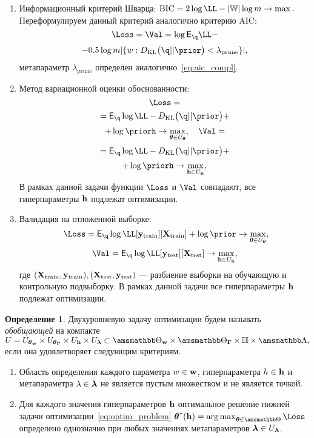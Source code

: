 \documentclass[11pt, a5paper]{dissert}
\theoremstyle{definition}
\newtheorem{defin}{Определение}
\DeclareMathOperator*{\argmax}{arg\,max}
\begin{document}
{\begin{enumerate}
\item Информационный критерий Шварца:
$
    \text{BIC} = 2\log \LL - |\Wb| \log m   \to \max.
$
Переформулируем данный критерий аналогично критерию AIC:
\begin{equation}
\label{eq:optim_bic}
    \Loss = \Val = \log \E_{\q}\LL - 
\end{equation}
\[
 - 0.5 \log m |\{w: \KL{\q}{\prior}<\lambda_{\text{prune}}\}|,
\]
метапараметр $\lambda_{\text{prune}}$ определен аналогично~\eqref{eq:aic_compl}.

\item Метод вариационной оценки обоснованности:
\begin{equation}
\label{eq:optim_elbo_method}   
    \Loss = 
\end{equation}
\[
= \E_{\q} \log \LL - \KL{\q}{\prior} + 
\]
\[
+\log\priorh \to \max_{\teta \in \Uteta}, \quad    \Val = 
\]
\[
= \E_{\q} \log \LL - \KL{\q}{\prior} +
\]
\[+ \log\priorh \to \max_{\h \in \Uh},
\]
В рамках данной задачи функции $\Loss$ и $\Val$ совпадают, все гиперпараметры $\mathbf{h}$ подлежат оптимизации.

\item Валидация на отложенной выборке:
\begin{equation}
\label{eq:optim_hold_out}
    \Loss = \E_{\q} \log \LL[\y_\text{train}][\X_\text{train}] + \log \prior \to \max_{\teta \in \Uteta},
\end{equation}
\[
    \Val = \E_{\q} \log \LL[\y_\text{test}][\X_\text{test}] \to \max_{\h \in \Uh},
\]
где $(\mathbf{X}_\text{train}, \mathbf{y}_\text{train}), (\mathbf{X}_\text{test}, \mathbf{y}_\text{test})$ --- разбиение выборки на обучающую и контрольную подвыборку.
В рамках данной задачи все гиперпараметры $\mathbf{h}$ подлежат оптимизации.

\end{enumerate}

\begin{defin}
Двухуровневую задачу оптимизации будем называть \textit{обобщающей} на компакте $U = \Utetaw \times \UtetaG \times \Uh \times \Ulam \subset \Tetawb \times \TetaGb \times \Hb \times \Lamb,$ если она удовлетворяет следующим критериям.
\begin{enumerate}
\item Область определения каждого параметра $w \in \mathbf{w}$, гиперпараметра $h \in \mathbf{h}$ и метапараметра $\lambda \in \boldsymbol{\lambda}$ не  является пустым множеством и не является точкой.
\item Для каждого значения гиперпараметров $\mathbf{h}$ оптимальное решение нижней задачи оптимизации~\eqref{eq:optim_problem} 
$
\teta^{*}(\h) = \argmax_{\teta \in \Tetab} \Loss
$
определено однозначно при любых значениях метапараметров $\boldsymbol{\lambda} \in U_{\boldsymbol{\lambda}}$.


\end{enumerate}
\end{defin}}
\end{document}

